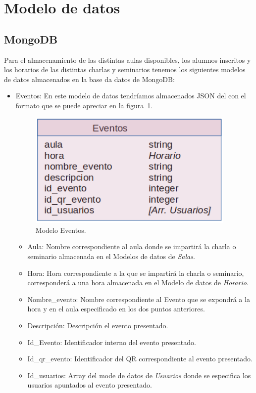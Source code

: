 \documentclass[a4paper, 12pt]{book}
\begin{document}
\section{Modelo de datos} 
\label{sec:modelo de datos}

\subsection{MongoDB}
	Para el almacenamiento de las distintas aulas disponibles, los alumnos inscritos y los horarios de las distintas charlas y seminarios tenemos los siguientes modelos de datos almacenados en la base da datos de MongoDB:
	
\begin{itemize}
	\item Eventos: En este modelo de datos tendríamos almacenados JSON del con el formato que se puede apreciar en la figura~\ref{fig:mongoDBEventos}.
	\begin{figure}[h!]
  	\centering
  	\includegraphics[width=10cm, keepaspectratio]{img/mongoDBEventos.png}
  	\caption{Modelo Eventos.}\label{fig:mongoDBEventos}
	\end{figure}
		\begin{itemize}
		\item Aula: Nombre correspondiente al aula donde se impartirá la charla o seminario almacenada en el Modelos de datos de \textit{Salas}.
		\item Hora: Hora correspondiente a la que se impartirá la charla o seminario, corresponderá a una hora almacenada en el Modelo de datos de \textit{Horario}.
		\item Nombre\_evento: Nombre correspondiente al Evento que se expondrá a la hora y en el aula especificado en los dos puntos anteriores.
		\item Descripción: Descripción el evento presentado.
		\item Id\_Evento: Identificador interno del evento presentado.
		\item Id\_qr\_evento: Identificador del QR correspondiente al evento presentado.
		\item Id\_usuarios: Array del mode de datos de \textit{Usuarios} donde se especifica los usuarios apuntados al evento presentado.
		\end{itemize}
		

\end{itemize}
\end{document}
